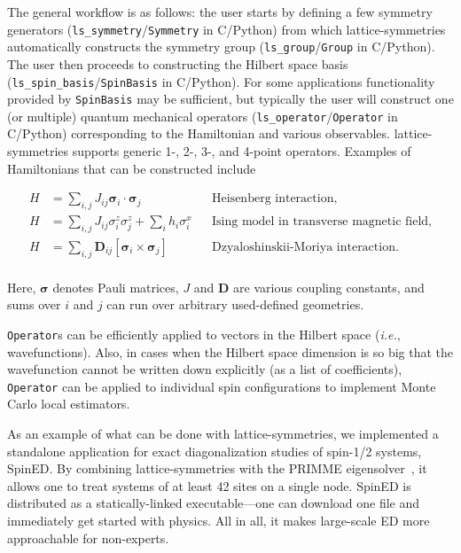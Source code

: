 The general workflow is as follows: the user starts by defining a few symmetry generators (\texttt{ls\_symmetry}/\texttt{Symmetry} in C/Python) from which lattice-symmetries automatically constructs the symmetry group (\texttt{ls\_group}/\texttt{Group} in C/Python). The user then proceeds to constructing the Hilbert space basis (\texttt{ls\_spin\_basis}/\texttt{SpinBasis} in C/Python). For some applications functionality provided by \texttt{SpinBasis} may be sufficient, but typically the user will construct one (or multiple) quantum mechanical operators (\texttt{ls\_operator}/\texttt{Operator} in C/Python) corresponding to the Hamiltonian and various observables. lattice-symmetries supports generic 1-, 2-, 3-, and 4-point operators. Examples of Hamiltonians that can be constructed include

\begin{equation*}
\begin{aligned}
    H &= \sum_{i, j} J_{ij} \boldsymbol\sigma_i \cdot \boldsymbol\sigma_j && \text{Heisenberg interaction,} \\
    H &= \sum_{i, j} J_{ij} \sigma^z_i \sigma^z_j + \sum_i h_i \sigma^x_i && \text{Ising model in transverse magnetic field,} \\
    H &= \sum_{i, j} \mathbf{D}_{ij} \left[ \boldsymbol\sigma_i \times \boldsymbol\sigma_j \right] && \text{Dzyaloshinskii-Moriya interaction.} \\
\end{aligned}
\end{equation*}

Here, $\boldsymbol\sigma$ denotes Pauli matrices, $J$ and $\mathbf{D}$ are various coupling constants, and sums over $i$ and $j$ can run over arbitrary used-defined geometries.

\texttt{Operator}s can be efficiently applied to vectors in the Hilbert space (\textit{i.e.}, wavefunctions). Also, in cases when the Hilbert space dimension is so big that the wavefunction cannot be written down explicitly (as a list of coefficients), \texttt{Operator} can be applied to individual spin configurations to implement Monte Carlo local estimators.

As an example of what can be done with lattice-symmetries, we implemented a standalone application for exact diagonalization studies of spin-1/2 systems, SpinED. By combining lattice-symmetries with the PRIMME eigensolver~\cite{Statho2010Primme}, it allows one to treat systems of at least 42 sites on a single node. SpinED is distributed as a statically-linked executable---one can download one file and immediately get started with physics. All in all, it makes large-scale ED more approachable for non-experts.


